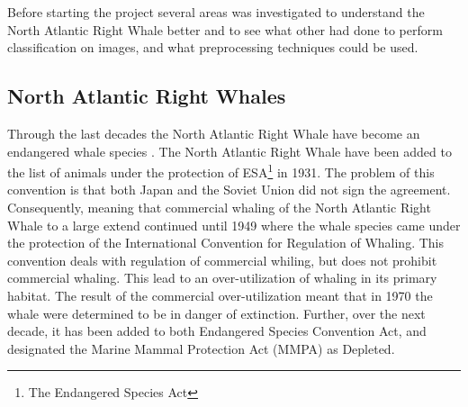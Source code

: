 Before starting the project several areas was investigated to understand the North Atlantic Right Whale better and to see what other had done to perform classification on images, and what preprocessing techniques could be used.

\subsection{North Atlantic Right Whales}
Through the last decades the North Atlantic Right Whale have become an endangered whale species \cite{NOAA}. The North Atlantic Right Whale have been added to the list of animals under the protection of ESA\footnote{The Endangered Species Act} in 1931. The problem of this convention is that both Japan and the Soviet Union did not sign the agreement. Consequently, meaning that commercial whaling of the North Atlantic Right Whale to a large extend continued until 1949 where the whale species came under the protection of the International Convention for Regulation of Whaling. 
This convention deals with regulation of commercial whiling, but does not prohibit commercial whaling. 
This lead to an over-utilization of whaling in its primary habitat. The result of the commercial over-utilization meant that in 1970 the whale were determined to be in danger of extinction. 
Further, over the next decade, it has been added to both Endangered Species Convention Act, and designated the Marine Mammal Protection Act (MMPA) as Depleted.

